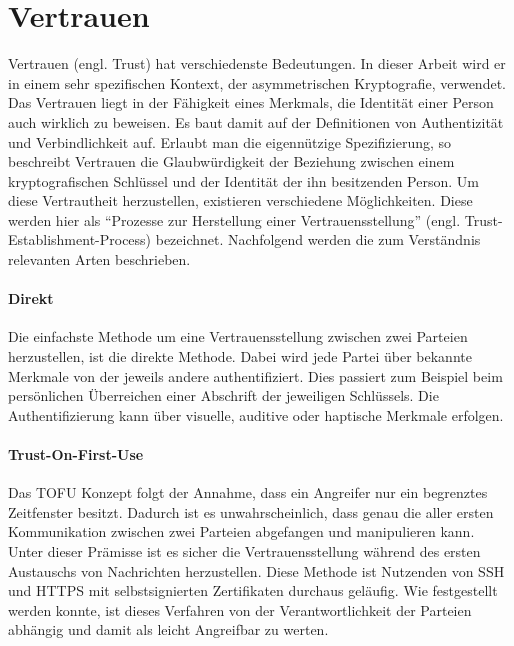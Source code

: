 \section{Vertrauen}
\label{sec:trust}
Vertrauen (engl. Trust) hat verschiedenste Bedeutungen. In dieser Arbeit wird er in einem sehr spezifischen Kontext, der asymmetrischen Kryptografie, verwendet. Das Vertrauen liegt in der Fähigkeit eines Merkmals, die Identität einer Person auch wirklich zu beweisen. Es baut damit auf der Definitionen von Authentizität und Verbindlichkeit auf\cite{Perrin2010}. Erlaubt man die eigennützige Spezifizierung, so beschreibt Vertrauen die Glaubwürdigkeit der Beziehung zwischen einem kryptografischen Schlüssel und der Identität der ihn besitzenden Person. Um diese Vertrautheit herzustellen, existieren verschiedene Möglichkeiten. Diese werden hier als ``Prozesse zur Herstellung einer Vertrauensstellung'' (engl. Trust-Establishment-Process) bezeichnet. Nachfolgend werden die zum Verständnis relevanten Arten beschrieben.

\paragraph{Direkt}
Die einfachste Methode um eine Vertrauensstellung zwischen zwei Parteien herzustellen, ist die direkte Methode. Dabei wird jede Partei über bekannte Merkmale von der jeweils andere authentifiziert. Dies passiert zum Beispiel beim persönlichen Überreichen einer Abschrift der jeweiligen Schlüssels. Die Authentifizierung kann über visuelle, auditive oder haptische Merkmale erfolgen.

\paragraph{Trust-On-First-Use}
Das \ac{TOFU} Konzept folgt der Annahme, dass ein Angreifer nur ein begrenztes Zeitfenster besitzt. Dadurch ist es unwahrscheinlich, dass genau die aller ersten Kommunikation zwischen zwei Parteien abgefangen und manipulieren kann. Unter dieser Prämisse ist es sicher die Vertrauensstellung während des ersten Austauschs von Nachrichten herzustellen. Diese Methode ist Nutzenden von \ac{SSH} und \acs{HTTPS} mit selbstsignierten Zertifikaten durchaus geläufig. Wie festgestellt werden konnte, ist dieses Verfahren von der Verantwortlichkeit der Parteien abhängig und damit als leicht Angreifbar zu werten\cite{Wendlandt2008}.

